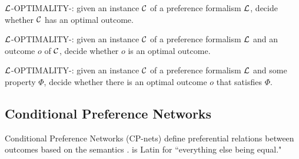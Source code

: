 \begin{definition}
\label{def:opt1}
  $\mathcal{L}$-OPTIMALITY-: given an instance $\mathcal{C}$ of a preference
	formalism $\mathcal{L}$,
  decide whether $\mathcal{C}$ has an optimal outcome.
\end{definition}

\begin{definition}
\label{def:opt2}
  $\mathcal{L}$-OPTIMALITY-: given an instance $\mathcal{C}$ of a preference
	formalism $\mathcal{L}$ and an outcome $o$ of $\mathcal{C}$,
  decide whether $o$ is an optimal outcome.
\end{definition}

\begin{definition}
\label{def:opt3}
  $\mathcal{L}$-OPTIMALITY-: given an instance $\mathcal{C}$ of a preference
	formalism $\mathcal{L}$ and some property $\Phi$,
  decide whether there is an optimal outcome $o$ that satisfies $\Phi$.
\end{definition}

\subsection{Conditional Preference Networks}
Conditional Preference Networks (CP-nets) define preferential relations between outcomes
based on the 
semantics \cite{bbdh03}.
 is Latin for ``everything else being equal."

